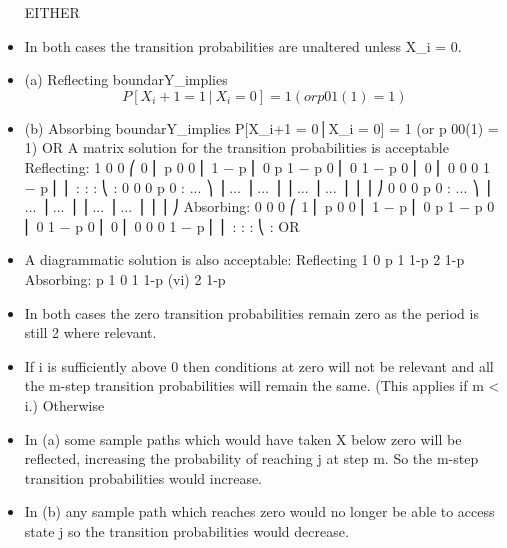 \documentclass[a4paper,12pt]{article}
\begin{document}
\begin{itemize}
EITHER
\item In both cases the transition probabilities
are unaltered unless X_i = 0.
\item (a) Reflecting boundarY_implies
\[P[X_i+1 = 1│X_i = 0] = 1 (or p 01(1) = 1)\]
\item (b) Absorbing boundarY_implies
P[X_i+1 = 0│X_i = 0] = 1 (or p 00(1) = 1)
OR
A matrix solution for the transition probabilities is acceptable
Reflecting:
1
0
0
⎛ 0
⎜
p
0
0
⎜ 1 − p
⎜ 0
p
1 − p
0
⎜
0
1 − p
0
⎜ 0
⎜ 0
0
0
1 − p
⎜ ⎜
:
:
:
⎝ :
0
0
0
p
0
: ... ⎞
⎟
... ⎟
... ⎟
⎟
... ⎟
... ⎟
⎟ ⎟
⎠
0
0
0
p
0
: ... ⎞
⎟
... ⎟
... ⎟
⎟
... ⎟
... ⎟
⎟ ⎟
⎠
Absorbing:
0
0
0
⎛ 1
⎜
p
0
0
⎜ 1 − p
⎜ 0
p
1 − p
0
⎜
0
1 − p
0
⎜ 0
⎜ 0
0
0
1 − p
⎜ ⎜
:
:
:
⎝ :
OR
\item A diagrammatic solution is also acceptable:
Reflecting
1
0
p
1
1-p
2
1-p
Absorbing:
p
1
0
1
1-p
(vi)
2
1-p
\item In both cases the zero transition probabilities remain
zero as the period is still 2 where relevant.
\item If i is sufficiently above 0 then conditions at zero
will not be relevant and all the m-step transition
probabilities will remain the same. (This applies if m < i.)
Otherwise
\item In (a) some sample paths which would have
taken X below zero will be reflected, increasing the
probability of reaching j at step m.
So the m-step transition probabilities would increase.
\item In (b) any sample path which reaches zero would
no longer be able to access state j
so the transition probabilities would decrease.
\end{itemize}
\end{document}
